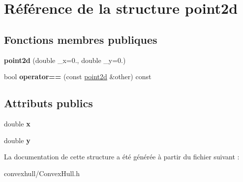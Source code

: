 \hypertarget{structpoint2d}{\section{Référence de la structure point2d}
\label{structpoint2d}
}
\subsection*{Fonctions membres publiques}
\begin{DoxyCompactItemize}
\item 
\hypertarget{structpoint2d_afbeffd9db7b07334c3acd3704450a153}{{\bfseries point2d} (double \-\_\-x=0., double \-\_\-y=0.)}\label{structpoint2d_afbeffd9db7b07334c3acd3704450a153}

\item 
\hypertarget{structpoint2d_a1ec29cd65e02a89118c25fadf9716d9a}{bool {\bfseries operator==} (const \hyperlink{structpoint2d}{point2d} \&other) const }\label{structpoint2d_a1ec29cd65e02a89118c25fadf9716d9a}

\end{DoxyCompactItemize}
\subsection*{Attributs publics}
\begin{DoxyCompactItemize}
\item 
\hypertarget{structpoint2d_ab4a4daa0a4308d990518ad6b07743e9f}{double {\bfseries x}}\label{structpoint2d_ab4a4daa0a4308d990518ad6b07743e9f}

\item 
\hypertarget{structpoint2d_a6aa51dbd7ccf826b371c9dc4f42049d1}{double {\bfseries y}}\label{structpoint2d_a6aa51dbd7ccf826b371c9dc4f42049d1}

\end{DoxyCompactItemize}


La documentation de cette structure a été générée à partir du fichier suivant \-:\begin{DoxyCompactItemize}
\item 
convexhull/Convex\-Hull.\-h\end{DoxyCompactItemize}
